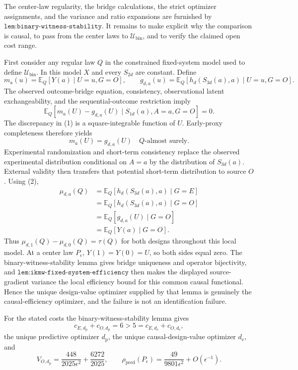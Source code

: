 The center-law regularity, the bridge calculations, the strict optimizer assignments, and the variance and ratio expansions are furnished by \(\texttt{lem:binary-witness-stability}\).  It remains to make explicit why the comparison is causal, to pass from the center laws to \(\mathcal U_{\mathrm{bin}}\), and to verify the claimed open cost range.

First consider any regular law \(Q\) in the constrained fixed-system model used to define \(\mathcal U_{\mathrm{bin}}\).  In this model \(X\) and every \(S_{2d}\) are constant.  Define
\[
 m_a(u)=\mathbb E_Q[Y(a)\mid U=u,G=O],
 \qquad
 g_{d,a}(u)=\mathbb E_Q[h_d(S_{3d}(a),a)\mid U=u,G=O].
\]
The observed outcome-bridge equation, consistency, observational latent exchangeability, and the sequential-outcome restriction imply
\[
 \mathbb E_Q[m_a(U)-g_{d,a}(U)\mid S_{1d}(a),A=a,G=O]=0. \tag{1}
\]
The discrepancy in (1) is a square-integrable function of \(U\).  Early-proxy completeness therefore yields
\[
 m_a(U)=g_{d,a}(U)\quad Q\text{-almost surely}. \tag{2}
\]
Experimental randomization and short-term consistency replace the observed experimental distribution conditional on \(A=a\) by the distribution of \(S_{3d}(a)\).  External validity then transfers that potential short-term distribution to source \(O\).  Using (2),
\[
 \begin{aligned}
 \mu_{d,a}(Q)
 &=\mathbb E_Q[h_d(S_{3d}(a),a)\mid G=E]\\
 &=\mathbb E_Q[h_d(S_{3d}(a),a)\mid G=O]\\
 &=\mathbb E_Q[g_{d,a}(U)\mid G=O]\\
 &=\mathbb E_Q[Y(a)\mid G=O].
 \end{aligned} \tag{3}
\]
Thus \(\mu_{d,1}(Q)-\mu_{d,0}(Q)=\tau(Q)\) for both designs throughout this local model.  At a center law \(P_\epsilon\), \(Y(1)=Y(0)=U\), so both sides equal zero.  The binary-witness-stability lemma gives bridge uniqueness and operator bijectivity, and \(\texttt{lem:ikmw-fixed-system-efficiency}\) then makes the displayed source-gradient variance the local efficiency bound for this common causal functional.  Hence the unique design-value optimizer supplied by that lemma is genuinely the causal-efficiency optimizer, and the failure is not an identification failure.

For the stated costs the binary-witness-stability lemma gives
\[
 c_{E,d_{\mathrm p}}+c_{O,d_{\mathrm p}}=6>5
 =c_{E,d_{\mathrm e}}+c_{O,d_{\mathrm e}},
\]
the unique predictive optimizer \(d_{\mathrm p}\), the unique causal-design-value optimizer \(d_{\mathrm e}\), and
\[
 V_{O,d_{\mathrm p}}
 =\frac{448}{2025\epsilon^2}+\frac{6272}{2025},
 \qquad
 \rho_{\mathrm{pred}}(P_\epsilon)
 =\frac{49}{9801\epsilon^2}+O(\epsilon^{-1}). \tag{4}
\]

